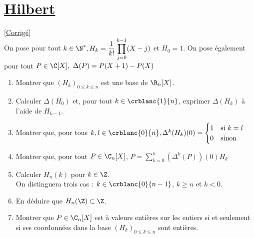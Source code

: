 \documentclass{book}
\begin{document}
	\section{\underline{Hilbert} }
	\textcolor{blue}{\hyperref[sec:Hilbert]{[Corrigé]}}\\
	\label{Hilbert}
	On pose pour tout $k\in\N^*,H_k=\displaystyle\frac{1}{k!}\prod\limits_{j=0}^{k-1}(X-j)$ et $H_0=1$. On pose également pour tout $P\in\C[X], \ \Delta(P)=P(X+1)-P(X)$
	\begin{enumerate}[leftmargin=*]
		\item Montrer que $(H_k)_{0\leq k\leq n}$ est une base de $\R_n[X]$.
		\item Calculer $\Delta(H_0)$ et, pour tout $k\in\crblanc{1}{n}$, exprimer $\Delta(H_k)$ à l'aide de $H_{k-1}$.
		\item Montrer que, pour tous $k,l \in\crblanc{0}{n}, \Delta^k(H_k)(0)=
		\begin{cases}
			1 & \mbox{si } k=l\\
			0 & \mbox{sinon}
		\end{cases}$
		\item Montrer que, pour tout $P\in\C_n[X]$, $P=\displaystyle\sum\limits_{k=0}^n(\Delta^k(P))(0)H_k$
		\item Calculer $H_n(k)$ pour $k\in \Z$.\\
		On distinguera trois cas : $k\in\crblanc{0}{n-1}$, $k\geq n$ et $k<0$.
		\item En déduire que $H_n(\Z)\subset\Z$.
		\item Montrer que $P\in\C_n[X]$ est à valeurs entières sur les entiers si et seulement si ses coordonnées dans la base $(H_k)_{0\leq k\leq n}$ sont entières.  
	\end{enumerate}
	
\end{document}
